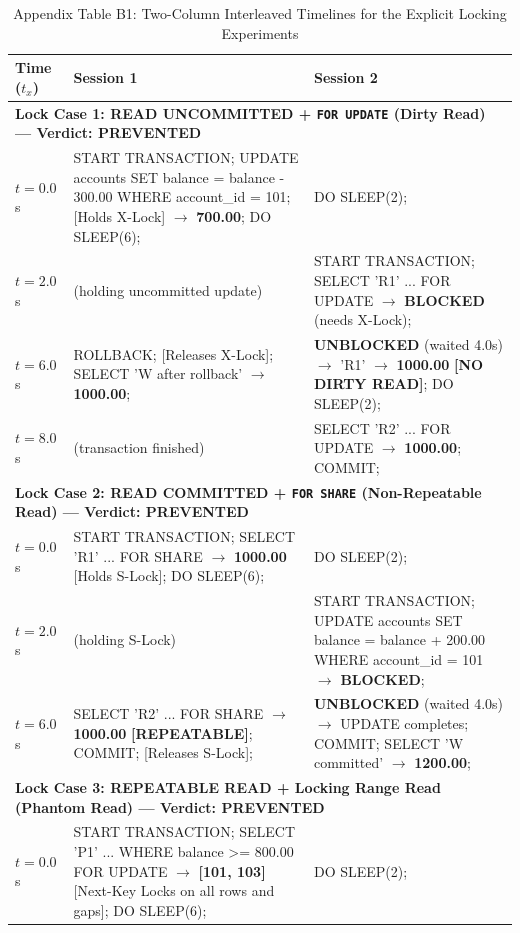 \documentclass[sigconf, pbalance, nonacm]{acmart}
\begin{document}
\begin{table}[p]
\centering
\small
\caption{Appendix Table B1: Two-Column Interleaved Timelines for the Explicit Locking Experiments}
\label{tab:app_lock}
\begin{tabularx}{\textwidth}{p{1.8cm} X X}
\toprule
\textbf{Time ($t_x$)} & \textbf{Session 1} & \textbf{Session 2} \\
\midrule
\multicolumn{3}{l}{\textbf{Lock Case 1: READ UNCOMMITTED + \texttt{FOR UPDATE} (Dirty Read) --- Verdict: PREVENTED}} \\
$t = 0.0$s & START TRANSACTION; UPDATE accounts SET balance = balance - 300.00 WHERE account\_id = 101; [Holds X-Lock] $\rightarrow$ \textbf{700.00}; DO SLEEP(6); & DO SLEEP(2); \\
$t = 2.0$s & (holding uncommitted update) & START TRANSACTION; SELECT 'R1' ... FOR UPDATE $\rightarrow$ \textbf{BLOCKED} (needs X-Lock); \\
$t = 6.0$s & ROLLBACK; [Releases X-Lock]; SELECT 'W after rollback' $\rightarrow$ \textbf{1000.00}; & \textbf{UNBLOCKED} (waited 4.0s) $\rightarrow$ 'R1' $\rightarrow$ \textbf{1000.00} \textbf{[NO DIRTY READ]}; DO SLEEP(2); \\
$t = 8.0$s & (transaction finished) & SELECT 'R2' ... FOR UPDATE $\rightarrow$ \textbf{1000.00}; COMMIT; \\
\midrule
\multicolumn{3}{l}{\textbf{Lock Case 2: READ COMMITTED + \texttt{FOR SHARE} (Non-Repeatable Read) --- Verdict: PREVENTED}} \\
$t = 0.0$s & START TRANSACTION; SELECT 'R1' ... FOR SHARE $\rightarrow$ \textbf{1000.00} [Holds S-Lock]; DO SLEEP(6); & DO SLEEP(2); \\
$t = 2.0$s & (holding S-Lock) & START TRANSACTION; UPDATE accounts SET balance = balance + 200.00 WHERE account\_id = 101 $\rightarrow$ \textbf{BLOCKED}; \\
$t = 6.0$s & SELECT 'R2' ... FOR SHARE $\rightarrow$ \textbf{1000.00} \textbf{[REPEATABLE]}; COMMIT; [Releases S-Lock]; & \textbf{UNBLOCKED} (waited 4.0s) $\rightarrow$ UPDATE completes; COMMIT; SELECT 'W committed' $\rightarrow$ \textbf{1200.00}; \\
\midrule
\multicolumn{3}{l}{\textbf{Lock Case 3: REPEATABLE READ + Locking Range Read (Phantom Read) --- Verdict: PREVENTED}} \\
$t = 0.0$s & START TRANSACTION; SELECT 'P1' ... WHERE balance >= 800.00 FOR UPDATE $\rightarrow$ \textbf{[101, 103]} [Next-Key Locks on all rows and gaps]; DO SLEEP(6); & DO SLEEP(2); \\

\end{tabularx}
\end{table}
\end{document}
